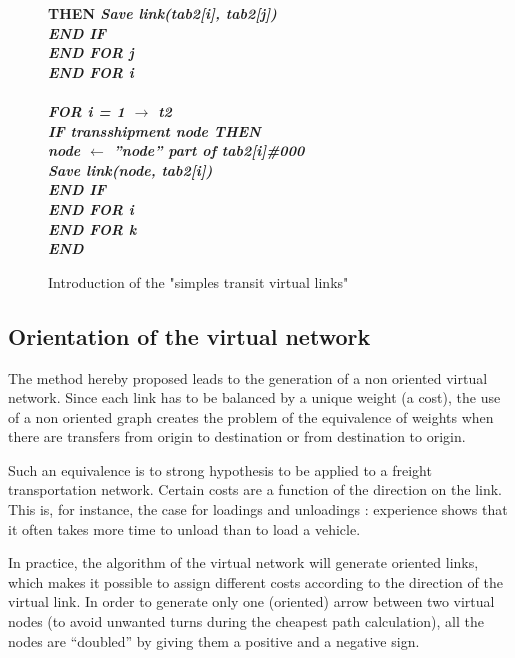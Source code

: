 \begin{center}
\begin{figure}[htbp]
{\begin{minipage}{20cm}
\begin{tabbing}
\> \> \> \> \> \bf{THEN} \it {Save link(tab2[i], tab2[j])}\\
\> \> \> \bf{END IF}\\
\> \> \bf{END FOR} j\\
\> \bf{END FOR} i\\
\\
\> \bf{FOR} i = 1 $\rightarrow$ t2\\
\> \> \bf{IF} \it{transshipment node} \bf{THEN}\\
\> \> \> node $\leftarrow$ \it{''node'' part of tab2[i]\#000}\\
\> \> \> \it{Save link(node, tab2[i])}\\
\> \> \bf{END IF}\\
\> \bf{END FOR} i\\
\bf {END FOR} k\\
\bf {END}\\
\end{tabbing}
\end{minipage}
}
\caption{\label{algo3} Introduction of the "simples transit virtual links"}
\end{figure}
\end{center}



\subsection{Orientation of the virtual network}


The method hereby proposed leads to the generation of a non oriented virtual
network.  Since each link has to be balanced by a unique weight (a cost), the
use of a non oriented graph creates the problem of the equivalence of weights
when there are transfers from origin to destination or from destination to
origin.

Such an equivalence is to strong hypothesis to be applied to a freight transportation network.  Certain
costs are a function of the direction on the link.  This is, for instance, the
case for loadings and unloadings : experience shows that it often
takes more time to unload than to load a vehicle.

In practice, the algorithm of the virtual network will generate oriented links,
which makes it possible to assign different costs according to the direction of
the virtual link. In order to generate only one (oriented) arrow between two virtual nodes (to avoid unwanted turns during the cheapest path calculation), all the nodes are ``doubled'' by giving them a positive and a negative sign. 

